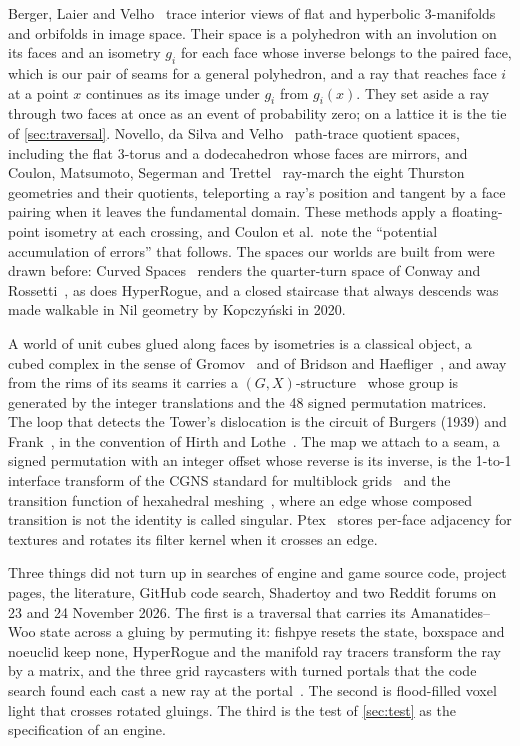 \documentclass[10pt,a4paper]{article}
\begin{document}
Berger, Laier and Velho~\cite{berger2015} trace interior views of flat and hyperbolic
3-manifolds and orbifolds in image space. Their space is a polyhedron with an involution on its
faces and an isometry $g_i$ for each face whose inverse belongs to the paired face, which is our
pair of seams for a general polyhedron, and a ray that reaches face $i$ at a point $x$ continues
as its image under $g_i$ from $g_i(x)$. They set aside a ray through two faces at once as an
event of probability zero; on a lattice it is the tie of \cref{sec:traversal}. Novello, da Silva and Velho~\cite{novello2020}
path-trace quotient spaces, including the flat 3-torus and a dodecahedron whose faces are
mirrors, and Coulon, Matsumoto, Segerman and Trettel~\cite{coulon2022} ray-march the eight
Thurston geometries and their quotients, teleporting a ray's position and tangent by a face
pairing when it leaves the fundamental domain. These methods apply a floating-point isometry at
each crossing, and Coulon et al.\ note the ``potential accumulation of errors'' that follows.
The spaces our worlds are built from were drawn before: Curved Spaces~\cite{curvedspaces}
renders the quarter-turn space of Conway and Rossetti~\cite{conway2003}, as does HyperRogue, and
a closed staircase that always descends was made walkable in Nil geometry by Kopczy\'nski in 2020.

A world of unit cubes glued along faces by isometries is a classical object, a cubed complex in
the sense of Gromov~\cite{gromov1987} and of Bridson and Haefliger~\cite{bridson1999}, and away
from the rims of its seams it carries a $(G, X)$-structure~\cite{thurston1997} whose group is
generated by the integer translations and the 48 signed permutation matrices. The loop that
detects the Tower's dislocation is the circuit of Burgers (1939) and Frank~\cite{frank1951}, in the convention of Hirth and
Lothe~\cite{hirth1968}. The map we
attach to a seam, a signed permutation with an integer offset whose reverse is its inverse, is the
1-to-1 interface transform of the CGNS standard for multiblock grids~\cite{cgns} and the
transition function of hexahedral meshing~\cite{nieser2011,lyon2016}, where an edge whose
composed transition is not the identity is called singular. Ptex~\cite{burley2008} stores
per-face adjacency for textures and rotates its filter kernel when it crosses an edge.

Three things did not turn up in searches of engine and game source code, project pages, the
literature, GitHub code search, Shadertoy and two Reddit forums on 23 and 24 November 2026. The
first is a traversal that carries its Amanatides--Woo state across a gluing by permuting it:
fishpye resets the state, boxspace and noeuclid keep none, HyperRogue and the manifold ray
tracers transform the ray by a matrix, and the three grid raycasters with turned portals that
the code search found each cast a new ray at the portal~\cite{portalraycaster,ultimateraycasting,weblabyrinth}. The second is flood-filled voxel light that crosses
rotated gluings. The third is the test of \cref{sec:test} as the specification of an engine.
\end{document}
